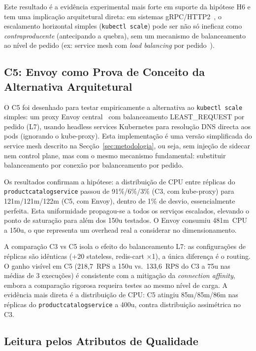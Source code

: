 \documentclass[manuscript,oneside]{acmart}
\begin{document}
Este resultado é a evidência experimental mais forte em suporte da hipótese H6 e tem uma implicação arquitetural direta: em sistemas gRPC/HTTP2~\cite{grpcloadbalancing}, o escalamento horizontal simples (\texttt{kubectl scale}) pode ser não só ineficaz como \emph{contraproducente} (antecipando a quebra), sem um mecanismo de balanceamento ao nível de pedido (ex: service mesh com \textit{load balancing} por pedido~\cite{k8sgrpc}).

\subsection{C5: Envoy como Prova de Conceito da Alternativa Arquitetural}

O C5 foi desenhado para testar empiricamente a alternativa ao \texttt{kubectl scale} simples: um proxy Envoy central~\cite{grpcloadbalancing} com balanceamento LEAST\_REQUEST por pedido (L7), usando headless services Kubernetes para resolução DNS directa aos pods (ignorando o kube-proxy). Esta implementação é uma versão simplificada do service mesh descrito na Secção~\ref{sec:metodologia}, ou seja, sem injeção de sidecar nem control plane, mas com o mesmo mecanismo fundamental: substituir balanceamento por conexão por balanceamento por pedido.

Os resultados confirmam a hipótese: a distribuição de CPU entre réplicas do \texttt{productcatalogservice} passou de 91\%/6\%/3\% (C3, com kube-proxy) para 121m/121m/122m (C5, com Envoy), dentro de 1\% de desvio, essencialmente perfeita. Esta uniformidade propagou-se a todos os serviços escalados, elevando o ponto de saturação para além dos 150u testados. O Envoy consumiu 481m~CPU a 150u, o que representa um overhead real a considerar no dimensionamento.

A comparação C3 vs C5 isola o efeito do balanceamento L7: as configurações de réplicas são idênticas (+20 stateless, redis-cart ×1), a única diferença é o routing. O ganho visível em C5 (218,7~RPS a 150u vs.\ 133,6~RPS do C3 a 75u nas médias de 3 execuções) é consistente com a mitigação da \textit{connection affinity}, embora a comparação rigorosa requeira testes ao mesmo nível de carga. A evidência mais direta é a distribuição de CPU: C5 atingiu 85m/85m/86m nas réplicas do \texttt{productcatalogservice} a 400u, contra distribuição assimétrica no C3.

\subsection{Leitura pelos Atributos de Qualidade}
\end{document}
